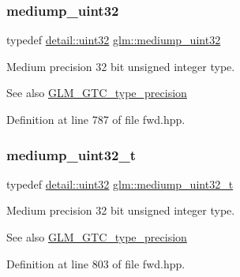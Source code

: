 \subsubsection{\texorpdfstring{mediump\+\_\+uint32}{mediump\_uint32}}
{\footnotesize\ttfamily typedef \hyperlink{namespaceglm_1_1detail_ade6cfbf377022aaa391af8cd50489222}{detail\+::uint32} \hyperlink{group__gtc__type__precision_ga861dbd1051f488e425b3966001b568e5}{glm\+::mediump\+\_\+uint32}}

Medium precision 32 bit unsigned integer type. \begin{DoxySeeAlso}{See also}
\hyperlink{group__gtc__type__precision}{G\+L\+M\+\_\+\+G\+T\+C\+\_\+type\+\_\+precision} 
\end{DoxySeeAlso}


Definition at line 787 of file fwd.\+hpp.

\mbox{\label{group__gtc__type__precision_gac7782c1e393f9ad47e41a177a685f287}} 
\subsubsection{\texorpdfstring{mediump\+\_\+uint32\+\_\+t}{mediump\_uint32\_t}}
{\footnotesize\ttfamily typedef \hyperlink{namespaceglm_1_1detail_ade6cfbf377022aaa391af8cd50489222}{detail\+::uint32} \hyperlink{group__gtc__type__precision_gac7782c1e393f9ad47e41a177a685f287}{glm\+::mediump\+\_\+uint32\+\_\+t}}

Medium precision 32 bit unsigned integer type. \begin{DoxySeeAlso}{See also}
\hyperlink{group__gtc__type__precision}{G\+L\+M\+\_\+\+G\+T\+C\+\_\+type\+\_\+precision} 
\end{DoxySeeAlso}


Definition at line 803 of file fwd.\+hpp.

\mbox{\label{group__gtc__type__precision_ga6685788d15d0a973ee7c2460d0456dc1}} 
